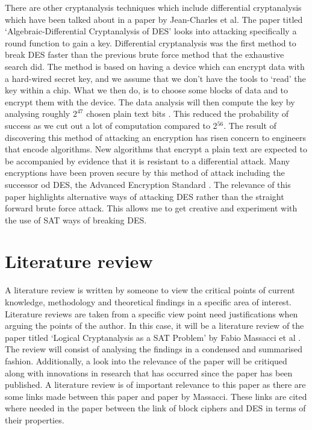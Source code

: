\documentclass[11pt,a4paper, notitlepage]{report}
\begin{document}
There are other cryptanalysis techniques which include differential cryptanalysis which have been talked about in a paper by Jean-Charles et al. The paper titled `Algebraic-Differential Cryptanalysis of DES' looks into attacking specifically a round function to gain a key. Differential cryptanalysis was the first method to break DES faster than the previous brute force method that the exhaustive search did. The method is based on having a device which can encrypt data with a hard-wired secret key, and we assume that we don't have the tools to `read' the key within a chip. What we then do, is to choose some blocks of data and to encrypt them with the device. The data analysis will then compute the key by analysing roughly $2^{47}$ chosen plain text bits \cite{Junod2013LASEC}. This reduced  the probability of success as we cut out a lot of computation compared to 2$^{56}$. The result of discovering this method of attacking an encryption has risen concern to engineers that encode algorithms. New algorithms that encrypt a plain text are expected to be accompanied by evidence that it is resistant to a differential attack. Many encryptions have been proven secure by this method of attack including the successor od DES, the Advanced Encryption Standard \cite{Jean2006Diff}. The relevance of this paper highlights alternative ways of attacking DES rather than the straight forward brute force attack. This allows me to get creative and experiment with the use of SAT ways of breaking DES. 






\chapter{Literature review}
\label{cha:LitReview}

A literature review is written by someone to view the critical points of current knowledge, methodology and theoretical findings in a specific area of interest. Literature reviews are taken from a specific view point need justifications when arguing the points of the author. In this case, it will be a literature review of the paper titled `Logical Cryptanalysis as a SAT Problem' by Fabio Massacci et al \cite{Fabio2000LogicalSAT}. The review will consist of analysing the findings in a condensed and summarised fashion. Additionally, a look into the relevance of the paper will be critiqued along with innovations in research that has occurred since the paper has been published. A literature review is of important relevance to this paper as there are some links made between this paper and paper by Massacci. These links are cited where needed in the paper between the link of block ciphers and DES in terms of their properties.  
\end{document}
